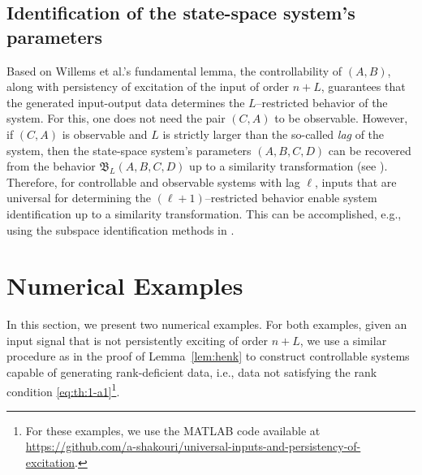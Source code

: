 \documentclass[journal,twoside,web]{ieeecolor}
\begin{document}
\subsection{Identification of the state-space system's parameters}

Based on Willems et al.'s fundamental lemma, the controllability of $(A,B)$, along with persistency of excitation of the input of order $n+L$, guarantees that the generated input-output data determines the $L$--restricted behavior of the system. For this, one does not need the pair $(C,A)$ to be observable. However, if $(C,A)$ is observable and $L$ is strictly larger than the so-called \emph{lag} of the system, then the state-space system's parameters $(A,B,C,D)$ can be recovered from the behavior $\mathfrak{B}_L(A,B,C,D)$ up to a similarity transformation (see \cite[Thm. 8.16]{markovsky2006exact}). Therefore, for controllable and observable systems with lag $\ell$, inputs that are universal for determining the $(\ell+1)$--restricted behavior enable system identification up to a similarity transformation. This can be accomplished, e.g., using the subspace identification methods in \cite[Ch. 9]{VERHAEGEN01111992}.

\section{Numerical Examples}
\label{sec:V}
 
In this section, we present two numerical examples. For both examples, given an input signal that is not persistently exciting of order $n+L$, we use a similar procedure as in the proof of Lemma~\ref{lem:henk} to construct controllable systems capable of generating rank-deficient data, i.e., data not satisfying the rank condition \eqref{eq:th:1-a1}\footnote{For these examples, we use the MATLAB code available at \href{https://github.com/a-shakouri/universal-inputs-and-persistency-of-excitation}{https://github.com/a-shakouri/universal-inputs-and-persistency-of-excitation}.}. 
\end{document}

